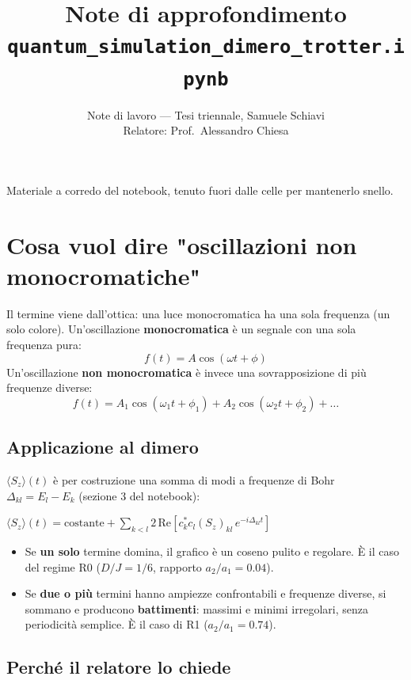 \documentclass[11pt,a4paper]{article}
\title{\vspace{-1.5em}\color{inkblue}Note di approfondimento\\[0.1em]\texttt{quantum\_simulation\_dimero\_trotter.ipynb}}
\author{Note di lavoro --- Tesi triennale, Samuele Schiavi\\ Relatore: Prof.\ Alessandro Chiesa}
\date{}
\begin{document}
\sloppy
\maketitle
\thispagestyle{fancy}
\vspace{-2em}

Materiale a corredo del notebook, tenuto fuori dalle celle per
mantenerlo snello.

\section{Cosa vuol dire "oscillazioni non monocromatiche"}

Il termine viene dall'ottica: una luce monocromatica ha una sola
frequenza (un solo colore). Un'oscillazione \textbf{monocromatica} è un
segnale con una sola frequenza pura:
$$f(t)=A\cos(\omega t+\phi)$$
Un'oscillazione \textbf{non monocromatica} è invece una sovrapposizione
di più frequenze diverse:
$$f(t)=A_1\cos(\omega_1 t+\phi_1)+A_2\cos(\omega_2 t+\phi_2)+\dots$$

\subsection*{Applicazione al dimero}

$\langle S_z\rangle(t)$ è per costruzione una somma di modi a frequenze
di Bohr $\Delta_{kl}=E_l-E_k$ (sezione 3 del notebook):
\begin{keyeq}
\centering
$\langle S_z\rangle(t)=\text{costante}+\displaystyle\sum_{k<l}2\,\mathrm{Re}\!\left[c_k^*c_l(S_z)_{kl}\,e^{-i\Delta_{kl}t}\right]$
\end{keyeq}

\begin{itemize}[leftmargin=1.3em,itemsep=0.2em]
\item Se \textbf{un solo} termine domina, il grafico è un coseno pulito
e regolare. È il caso del regime R0 ($D/J=1/6$, rapporto
$a_2/a_1=0.04$).
\item Se \textbf{due o più} termini hanno ampiezze confrontabili e
frequenze diverse, si sommano e producono \textbf{battimenti}: massimi
e minimi irregolari, senza periodicità semplice. È il caso di R1
($a_2/a_1=0.74$).
\end{itemize}

\subsection*{Perché il relatore lo chiede}
\end{document}
